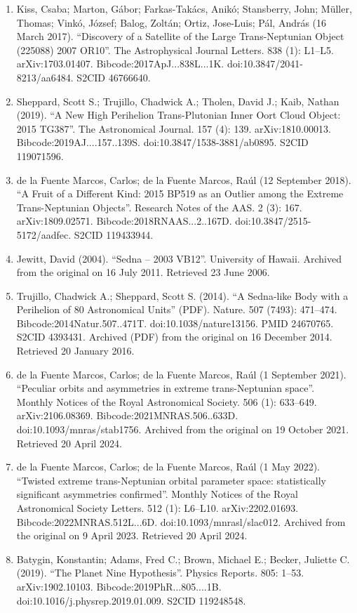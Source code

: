 \begin{enumerate}
\item Kiss, Csaba; Marton, Gábor; Farkas-Takács, Anikó; Stansberry, John; Müller, Thomas; Vinkó, József; Balog, Zoltán; Ortiz, Jose-Luis; Pál, András (16 March 2017). ``Discovery of a Satellite of the Large Trans-Neptunian Object (225088) 2007 OR10''. The Astrophysical Journal Letters. 838 (1): L1–L5. arXiv:1703.01407. Bibcode:2017ApJ...838L...1K. doi:10.3847/2041-8213/aa6484. S2CID 46766640.
\item Sheppard, Scott S.; Trujillo, Chadwick A.; Tholen, David J.; Kaib, Nathan (2019). ``A New High Perihelion Trans-Plutonian Inner Oort Cloud Object: 2015 TG387''. The Astronomical Journal. 157 (4): 139. arXiv:1810.00013. Bibcode:2019AJ....157..139S. doi:10.3847/1538-3881/ab0895. S2CID 119071596.
\item de la Fuente Marcos, Carlos; de la Fuente Marcos, Raúl (12 September 2018). ``A Fruit of a Different Kind: 2015 BP519 as an Outlier among the Extreme Trans-Neptunian Objects''. Research Notes of the AAS. 2 (3): 167. arXiv:1809.02571. Bibcode:2018RNAAS...2..167D. doi:10.3847/2515-5172/aadfec. S2CID 119433944.
\item Jewitt, David (2004). ``Sedna – 2003 VB12''. University of Hawaii. Archived from the original on 16 July 2011. Retrieved 23 June 2006.
\item Trujillo, Chadwick A.; Sheppard, Scott S. (2014). ``A Sedna-like Body with a Perihelion of 80 Astronomical Units'' (PDF). Nature. 507 (7493): 471–474. Bibcode:2014Natur.507..471T. doi:10.1038/nature13156. PMID 24670765. S2CID 4393431. Archived (PDF) from the original on 16 December 2014. Retrieved 20 January 2016.
\item de la Fuente Marcos, Carlos; de la Fuente Marcos, Raúl (1 September 2021). ``Peculiar orbits and asymmetries in extreme trans-Neptunian space''. Monthly Notices of the Royal Astronomical Society. 506 (1): 633–649. arXiv:2106.08369. Bibcode:2021MNRAS.506..633D. doi:10.1093/mnras/stab1756. Archived from the original on 19 October 2021. Retrieved 20 April 2024.
\item de la Fuente Marcos, Carlos; de la Fuente Marcos, Raúl (1 May 2022). ``Twisted extreme trans-Neptunian orbital parameter space: statistically significant asymmetries confirmed''. Monthly Notices of the Royal Astronomical Society Letters. 512 (1): L6–L10. arXiv:2202.01693. Bibcode:2022MNRAS.512L...6D. doi:10.1093/mnrasl/slac012. Archived from the original on 9 April 2023. Retrieved 20 April 2024.
\item Batygin, Konstantin; Adams, Fred C.; Brown, Michael E.; Becker, Juliette C. (2019). ``The Planet Nine Hypothesis''. Physics Reports. 805: 1–53. arXiv:1902.10103. Bibcode:2019PhR...805....1B. doi:10.1016/j.physrep.2019.01.009. S2CID 119248548.

\end{enumerate}
